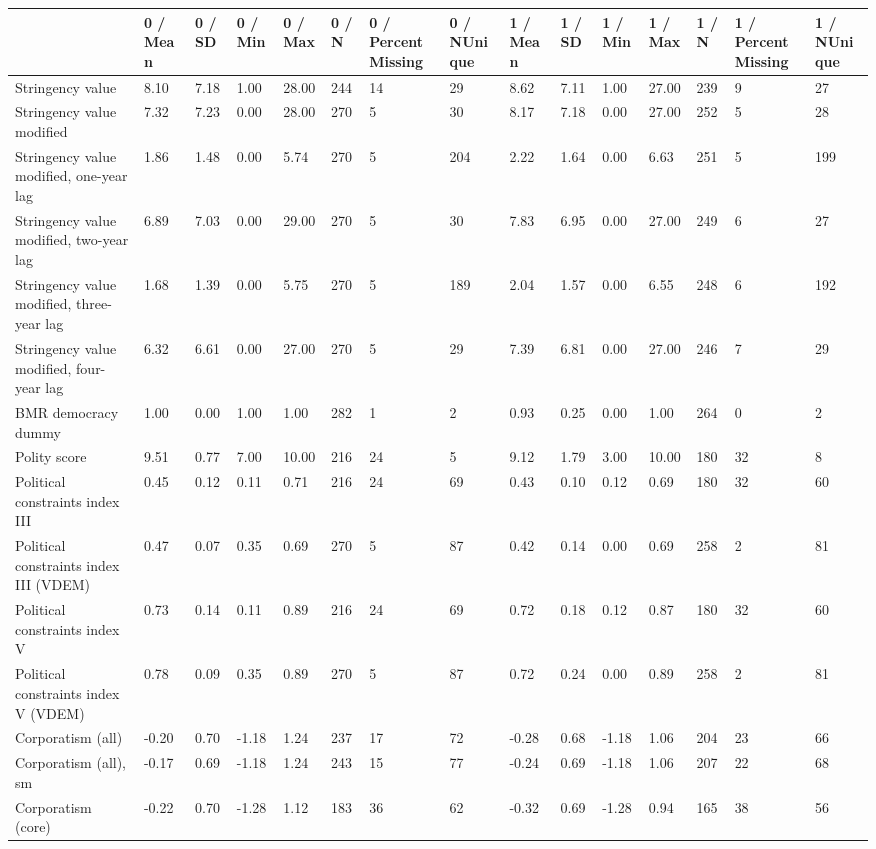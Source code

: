 
\begin{longtable}{lllllllllllllll}
\toprule
  & 0 / Mean & 0 / SD & 0 / Min & 0 / Max & 0 / N & 0 / PercentMissing & 0 / NUnique & 1 / Mean & 1 / SD & 1 / Min & 1 / Max & 1 / N & 1 / PercentMissing & 1 / NUnique\\
\midrule
Stringency value & 8.10 & 7.18 & 1.00 & 28.00 & 244 & 14 & 29 & 8.62 & 7.11 & 1.00 & 27.00 & 239 & 9 & 27\\
Stringency value modified & 7.32 & 7.23 & 0.00 & 28.00 & 270 & 5 & 30 & 8.17 & 7.18 & 0.00 & 27.00 & 252 & 5 & 28\\
Stringency value modified, one-year lag & 1.86 & 1.48 & 0.00 & 5.74 & 270 & 5 & 204 & 2.22 & 1.64 & 0.00 & 6.63 & 251 & 5 & 199\\
Stringency value modified, two-year lag & 6.89 & 7.03 & 0.00 & 29.00 & 270 & 5 & 30 & 7.83 & 6.95 & 0.00 & 27.00 & 249 & 6 & 27\\
Stringency value modified, three-year lag & 1.68 & 1.39 & 0.00 & 5.75 & 270 & 5 & 189 & 2.04 & 1.57 & 0.00 & 6.55 & 248 & 6 & 192\\
\addlinespace
Stringency value modified, four-year lag & 6.32 & 6.61 & 0.00 & 27.00 & 270 & 5 & 29 & 7.39 & 6.81 & 0.00 & 27.00 & 246 & 7 & 29\\
BMR democracy dummy & 1.00 & 0.00 & 1.00 & 1.00 & 282 & 1 & 2 & 0.93 & 0.25 & 0.00 & 1.00 & 264 & 0 & 2\\
Polity score & 9.51 & 0.77 & 7.00 & 10.00 & 216 & 24 & 5 & 9.12 & 1.79 & 3.00 & 10.00 & 180 & 32 & 8\\
Political constraints index III & 0.45 & 0.12 & 0.11 & 0.71 & 216 & 24 & 69 & 0.43 & 0.10 & 0.12 & 0.69 & 180 & 32 & 60\\
Political constraints index III (VDEM) & 0.47 & 0.07 & 0.35 & 0.69 & 270 & 5 & 87 & 0.42 & 0.14 & 0.00 & 0.69 & 258 & 2 & 81\\
\addlinespace
Political constraints index V & 0.73 & 0.14 & 0.11 & 0.89 & 216 & 24 & 69 & 0.72 & 0.18 & 0.12 & 0.87 & 180 & 32 & 60\\
Political constraints index V (VDEM) & 0.78 & 0.09 & 0.35 & 0.89 & 270 & 5 & 87 & 0.72 & 0.24 & 0.00 & 0.89 & 258 & 2 & 81\\
Corporatism (all) & -0.20 & 0.70 & -1.18 & 1.24 & 237 & 17 & 72 & -0.28 & 0.68 & -1.18 & 1.06 & 204 & 23 & 66\\
Corporatism (all), sm & -0.17 & 0.69 & -1.18 & 1.24 & 243 & 15 & 77 & -0.24 & 0.69 & -1.18 & 1.06 & 207 & 22 & 68\\
Corporatism (core) & -0.22 & 0.70 & -1.28 & 1.12 & 183 & 36 & 62 & -0.32 & 0.69 & -1.28 & 0.94 & 165 & 38 & 56\\

\end{longtable}
